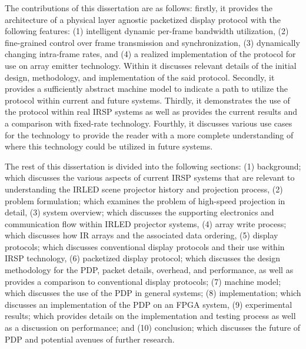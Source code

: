 The contributions of this dissertation are as follows: firstly, it provides the architecture of a physical layer agnostic packetized display protocol with the following features: (1) intelligent dynamic per-frame bandwidth utilization, (2) fine-grained control over frame transmission and synchronization, (3) dynamically changing intra-frame rates, and (4) a realized implementation of the protocol for use on array emitter technology. Within it discusses relevant details of the initial design, methodology, and implementation of the said protocol. Secondly, it provides a sufficiently abstract machine model to indicate a path to utilize the protocol within current and future systems. Thirdly, it demonstrates the use of the protocol within real IRSP systems as well as provides the current results and a comparison with fixed-rate technology. Fourthly, it discusses various use cases for the technology to provide the reader with a more complete understanding of where this technology could be utilized in future systems.

The rest of this dissertation is divided into the following sections: (1) background; which discusses the various aspects of current IRSP systems that are relevant to understanding the IRLED scene projector history and projection process, (2) problem formulation; which examines the problem of high-speed projection in detail, (3) system overview; which discusses the supporting electronics and communication flow within IRLED projector systems, (4) array write process; which discusses how IR arrays and the associated data ordering, (5) display protocols; which discusses conventional display protocols and their use within IRSP technology, (6) packetized display protocol; which discusses the design methodology for the PDP, packet details, overhead, and performance, as well as provides a comparison to conventional display protocols; (7) machine model; which discusses the use of the PDP in general systems; (8) implementation; which discusses an implementation of the PDP on an FPGA system, (9) experimental results; which provides details on the implementation and testing process as well as a discussion on performance; and (10) conclusion; which discusses the future of PDP and potential avenues of further research.
